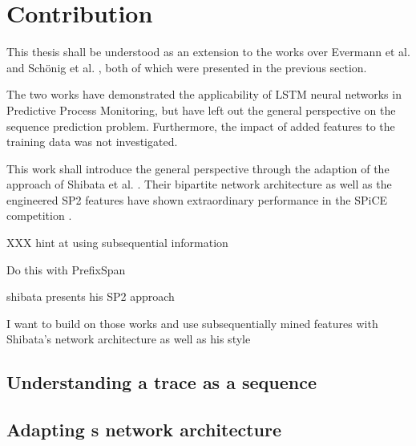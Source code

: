 \chapter{Contribution}\label{sec:contribution}
This thesis shall be understood as an extension to the works over Evermann et al. \cite{evermann2016} and Schönig et al. \cite{schoenig2018}, both of which were presented in the previous section.

The two works have demonstrated the applicability of LSTM neural networks in Predictive Process Monitoring, but have left out the general perspective on the sequence prediction problem. Furthermore, the impact of added features to the training data was not investigated.

This work shall introduce the general perspective through the adaption of the approach of Shibata et al. \cite{shibata2016bipartite}. Their bipartite network architecture as well as the engineered SP2 features have shown extraordinary performance in the SPiCE competition \cite{web:spice}.

XXX hint at using subsequential information

Do this with PrefixSpan

shibata presents his SP2 approach

I want to build on those works and use subsequentially mined features with Shibata's network architecture as well as his style

\section{Understanding a trace as a sequence}

\section{Adapting s network architecture}

